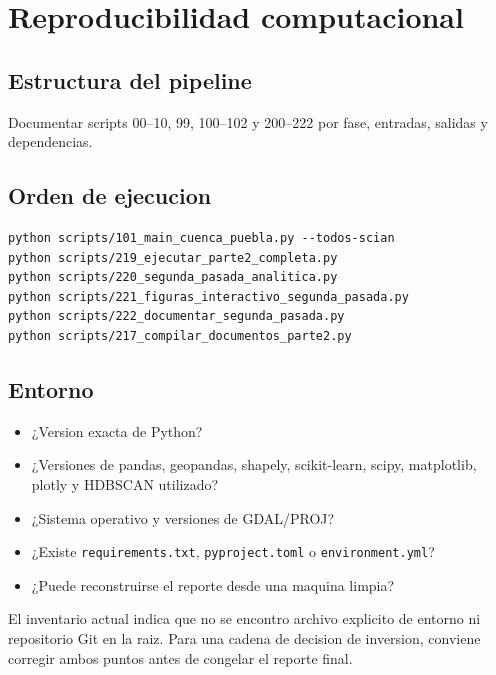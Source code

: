 \documentclass[11pt,letterpaper]{article}
\newcommand{\ruta}[1]{\texttt{#1}}
\begin{document}
\section{Reproducibilidad computacional}

\subsection{Estructura del pipeline}
Documentar scripts 00--10, 99, 100--102 y 200--222 por fase, entradas, salidas y dependencias.

\subsection{Orden de ejecucion}
\begin{verbatim}
python scripts/101_main_cuenca_puebla.py --todos-scian
python scripts/219_ejecutar_parte2_completa.py
python scripts/220_segunda_pasada_analitica.py
python scripts/221_figuras_interactivo_segunda_pasada.py
python scripts/222_documentar_segunda_pasada.py
python scripts/217_compilar_documentos_parte2.py
\end{verbatim}

\subsection{Entorno}
\begin{preguntas}
\begin{itemize}
    \item ¿Version exacta de Python?
    \item ¿Versiones de pandas, geopandas, shapely, scikit-learn, scipy, matplotlib, plotly y HDBSCAN utilizado?
    \item ¿Sistema operativo y versiones de GDAL/PROJ?
    \item ¿Existe \ruta{requirements.txt}, \ruta{pyproject.toml} o \ruta{environment.yml}?
    \item ¿Puede reconstruirse el reporte desde una maquina limpia?
\end{itemize}
\end{preguntas}

\begin{alerta}
El inventario actual indica que no se encontro archivo explicito de entorno ni repositorio Git en la raiz. Para una cadena de decision de inversion, conviene corregir ambos puntos antes de congelar el reporte final.
\end{alerta}
\end{document}
